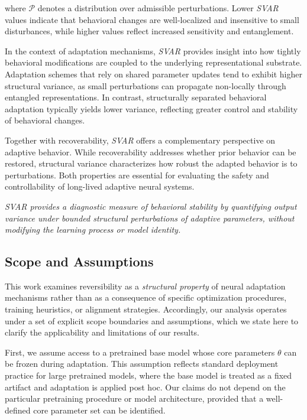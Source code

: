 \documentclass{article}
\begin{document}
	where $\mathcal{P}$ denotes a distribution over admissible perturbations. Lower \emph{SVAR} values indicate that behavioral changes are well-localized and insensitive to small disturbances, while higher values reflect increased sensitivity and entanglement.
	
	In the context of adaptation mechanisms, \emph{SVAR} provides insight into how tightly behavioral modifications are coupled to the underlying representational substrate. Adaptation schemes that rely on shared parameter updates tend to exhibit higher structural variance, as small perturbations can propagate non-locally through entangled representations. In contrast, structurally separated behavioral adaptation typically yields lower variance, reflecting greater control and stability of behavioral changes.
	
	Together with recoverability, \emph{SVAR} offers a complementary perspective on adaptive behavior. While recoverability addresses whether prior behavior can be restored, structural variance characterizes how robust the adapted behavior is to perturbations. Both properties are essential for evaluating the safety and controllability of long-lived adaptive neural systems.
	
	\emph{SVAR provides a diagnostic measure of behavioral stability by quantifying output variance under bounded structural perturbations of adaptive parameters, without modifying the learning process or model identity.}
	
	\subsection{Scope and Assumptions}
	\label{sec:scope}
	
	This work examines reversibility as a \emph{structural property} of neural adaptation mechanisms rather than as a consequence of specific optimization procedures, training heuristics, or alignment strategies. Accordingly, our analysis operates under a set of explicit scope boundaries and assumptions, which we state here to clarify the applicability and limitations of our results.
	
	First, we assume access to a pretrained base model whose core parameters $\theta$ can be frozen during adaptation. This assumption reflects standard deployment practice for large pretrained models, where the base model is treated as a fixed artifact and adaptation is applied post hoc. Our claims do not depend on the particular pretraining procedure or model architecture, provided that a well-defined core parameter set can be identified.
	
\end{document}
